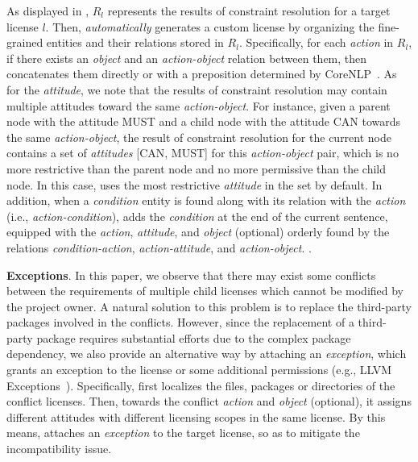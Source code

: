 As displayed in , $R_l$ represents the results of constraint resolution for a target license $l$. Then, \tool \textit{automatically} generates a custom license by organizing the fine-grained entities and their relations stored in $R_l$. Specifically, for each \textit{action} in $R_l$, if there exists an \textit{object} and an \textit{action-object} relation between them, then \tool concatenates them directly or with a preposition determined by {CoreNLP}~\cite{url-corenlp}. As for the \textit{attitude}, we note that the results of constraint resolution may contain multiple attitudes toward the same \textit{action-object}. For instance, given a parent node with the {attitude} MUST and a child node with the {attitude} CAN towards the same \textit{action-object}, the result of constraint resolution for the current node contains a set of \textit{attitudes} [CAN, MUST] for this \textit{action-object} pair, which is no more restrictive than the parent node and no more permissive than the child node. In this case, \tool uses the most restrictive \textit{attitude} in the set by default. In addition, when a \textit{condition} entity is found along with its relation with the \textit{action} (i.e., \textit{action-condition}), \tool adds the \textit{condition} at the end of the current sentence, equipped with the \textit{action}, \textit{attitude}, and \textit{object} (optional) orderly found by the relations \textit{condition-action}, \textit{action-attitude}, and \textit{action-object}. .


\smallskip
\noindent \textbf{Exceptions}. In this paper, we observe that there may exist some conflicts between the requirements of multiple child licenses which cannot be modified by the project owner. A natural solution to this problem is to replace the third-party packages involved in the conflicts. However, since the replacement of a third-party package requires substantial efforts due to the complex package dependency, we also provide an alternative way by attaching an \textit{exception}, which grants an exception to the license or some additional permissions (e.g., LLVM Exceptions~\cite{url-llvm}). Specifically, \tool first localizes the files, packages or directories of the conflict licenses. Then, towards the conflict \textit{action} and \textit{object} (optional), it assigns different attitudes with different licensing scopes in the same license. By this means, \tool attaches an \textit{exception} to the target license, so as to mitigate the incompatibility issue.


